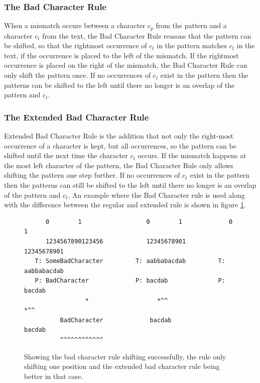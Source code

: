\subsubsection{The Bad Character Rule}
When a mismatch occurs between a character $c_p$ from the pattern and a character $c_t$ from the text, the Bad Character Rule reasons that the pattern can be shifted, so that the rightmost occurrence of $c_t$ in the pattern matches $c_t$ in the text, if the occurrence is placed to the left of the mismatch. If the rightmost occurrence is placed on the right of the mismatch, the Bad Character Rule can only shift the pattern once. If no occurrences of $c_t$ exist in the pattern then the patterns can be shifted to the left until there no longer is an overlap of the pattern and $c_t$.

\subsubsection{The Extended Bad Character Rule}
Extended Bad Character Rule is the addition that not only the right-most occurrence of a character is kept, but all occurrences, so the pattern can be shifted until the next time the character $c_t$ occurs. If the mismatch happens at the most left character of the pattern, the Bad Character Rule only allows shifting the pattern one step further.  If no occurrences of $c_t$ exist in the pattern then the patterns can still be shifted to the left until there no longer is an overlap of the pattern and $c_t$. An example where the Bad Character rule is used along with the difference between the regular and extended rule is shown in figure \ref{fig:badcharacterrule_example}. 

\begin{figure}[t]
\begin{verbatim}
      0        1                  0        1             0        1      
      1234567890123456            12345678901            12345678901
   T: SomeBadCharacter         T: aabbabacdab         T: aabbabacdab
   P: BadCharacter             P: bacdab              P: bacdab          
                 *                   *^^                    *^^     
          BadCharacter             bacdab                   bacdab  
          ^^^^^^^^^^^^                                              
\end{verbatim}
\caption{Showing the bad character rule shifting successfully, the rule only shifting one position and the extended bad character rule being better in that case.}
\label{fig:badcharacterrule_example}
\end{figure}

